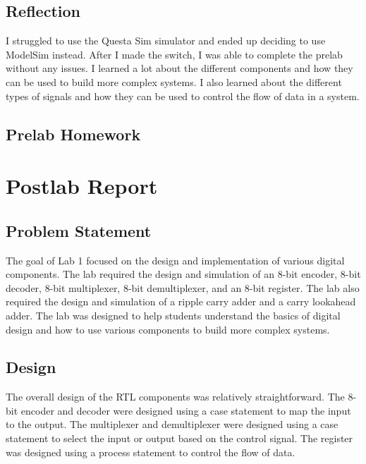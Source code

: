\documentclass{article}
\begin{document}
\subsection*{Reflection}
I struggled to use the Questa Sim simulator and ended up deciding to use ModelSim instead. After I made the switch, I was able to complete the prelab without any issues. I learned a lot about the different components and how they can be used to build more complex systems. I also learned about the different types of signals and how they can be used to control the flow of data in a system.

\subsection*{Prelab Homework}

\section*{Postlab Report}

\subsection*{Problem Statement}
The goal of Lab 1 focused on the design and implementation of various digital components. The lab required the design and simulation of an 8-bit encoder, 8-bit decoder, 8-bit multiplexer, 8-bit demultiplexer, and an 8-bit register. The lab also required the design and simulation of a ripple carry adder and a carry lookahead adder. The lab was designed to help students understand the basics of digital design and how to use various components to build more complex systems.

\subsection*{Design}
The overall design of the RTL components was relatively straightforward. The 8-bit encoder and decoder were designed using a case statement to map the input to the output. The multiplexer and demultiplexer were designed using a case statement to select the input or output based on the control signal. The register was designed using a process statement to control the flow of data. 
\end{document}
